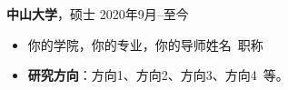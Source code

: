 \documentclass[11pt]{article}
\begin{document}
\begin{minipage}[t]{0.78\textwidth}
\begin{minipage}[t]{\textwidth}
        \vspace{0.5em}
        {\large \textbf{中山大学}}，硕士 \hfill 2020年9月--至今
        \begin{itemize}
            \item 你的学院，你的专业，你的导师姓名\ 职称
            \item \textbf{研究方向}：方向1、方向2、方向3、方向4\ 等。
        \end{itemize}
        
        \vspace{1.2em}
        \end{minipage}
    \end{minipage}
    \hfill
    \begin{minipage}[t]{0.2\textwidth}
        \vspace{2em} %
        \setlength{\fboxsep}{0pt}
    \end{minipage}
\end{document}

